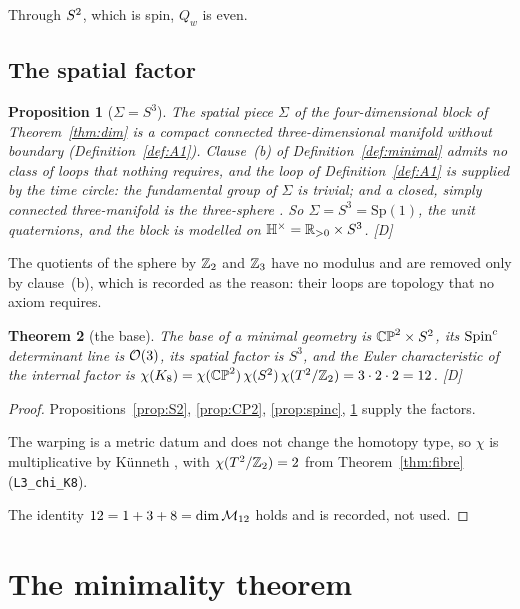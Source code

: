 \documentclass[11pt,a4paper]{article}
\theoremstyle{plain}
\newtheorem{theorem}{Theorem}[section]
\newtheorem{proposition}[theorem]{Proposition}
\theoremstyle{definition}
\theoremstyle{remark}
\newcommand{\Hquat}{\mathbb{H}}
\newcommand{\rigD}{[\textup{D}]}
\begin{document}
Through $S^2$, which is spin, $Q_{w}$ is even.

\subsection{The spatial factor}

\begin{proposition}[$\Sigma=S^{3}$]\label{prop:S3}
The spatial piece $\Sigma$ of the four-dimensional block of Theorem~\ref{thm:dim} is a compact connected three-dimensional manifold without boundary (Definition~\ref{def:A1}). Clause~(b) of Definition~\ref{def:minimal} admits no class of loops that nothing requires, and the loop of Definition~\ref{def:A1} is supplied by the time circle: the fundamental group of $\Sigma$ is trivial; and a closed, simply connected three-manifold is the three-sphere \cite{MorganTian}. So $\Sigma=S^{3}=\mathrm{Sp}(1)$, the unit quaternions, and the block is modelled on $\Hquat^{\times}=\R_{>0}\times S^{3}$. \rigD
\end{proposition}

The quotients of the sphere by $\mathbb{Z}_{2}$ and $\mathbb{Z}_{3}$ have no modulus and are removed only by clause~(b), which is recorded as the reason: their loops are topology that no axiom requires.

\begin{theorem}[the base]\label{thm:base}
The base of a minimal geometry is $\mathbb{CP}^2\times S^2$, its $\text{Spin}^c$ determinant line is $\mathcal{O}(3)$, its spatial factor is $S^{3}$, and the Euler characteristic of the internal factor is $\chi(K_8)=\chi(\mathbb{CP}^2)\,\chi(S^2)\,\chi(T^2/\mathbb{Z}_2)=3\cdot2\cdot2=12$. \rigD
\end{theorem}

\begin{proof}
Propositions~\ref{prop:S2}, \ref{prop:CP2}, \ref{prop:spinc}, \ref{prop:S3} supply the factors.

The warping is a metric datum and does not change the homotopy type, so $\chi$ is multiplicative by K\"unneth \cite{Hatcher}, with $\chi(T^2/\mathbb{Z}_2)=2$ from Theorem~\ref{thm:fibre} (\texttt{L3\_chi\_K8}).

The identity $12=1+3+8=\dim\mathcal{M}_{12}$ holds and is recorded, not used.
\end{proof}

\section{The minimality theorem}\label{sec:theorem}
\end{document}
